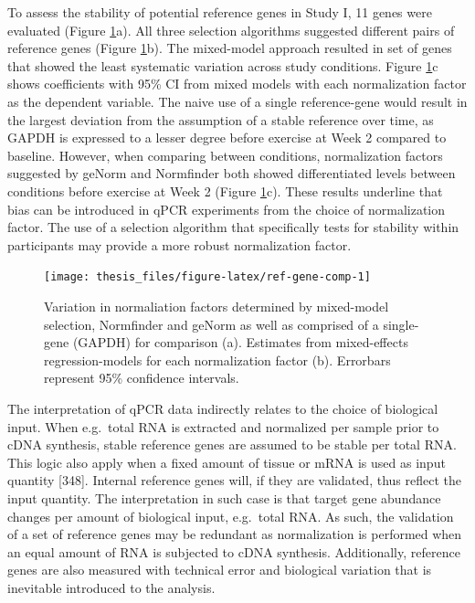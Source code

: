 \documentclass[twoside,10pt]{gihclass} %
\begin{document}
To assess the stability of potential reference genes in Study I, 11 genes were evaluated (Figure \ref{fig:ref-gene-comp}a). All three selection algorithms suggested different pairs of reference genes (Figure \ref{fig:ref-gene-comp}b). The mixed-model approach resulted in set of genes that showed the least systematic variation across study conditions. Figure \ref{fig:ref-gene-comp}c shows coefficients with 95\% CI from mixed models with each normalization factor as the dependent variable. The naive use of a single reference-gene would result in the largest deviation from the assumption of a stable reference over time, as GAPDH is expressed to a lesser degree before exercise at Week 2 compared to baseline. However, when comparing between conditions, normalization factors suggested by geNorm and Normfinder both showed differentiated levels between conditions before exercise at Week 2 (Figure \ref{fig:ref-gene-comp}c). These results underline that bias can be introduced in qPCR experiments from the choice of normalization factor. The use of a selection algorithm that specifically tests for stability within participants may provide a more robust normalization factor.
\begin{figure}

{\centering \texttt{[image: thesis\_files/figure-latex/ref-gene-comp-1]} 

}

\caption[Reference gene selection in Study I]{Variation in normaliation factors determined by mixed-model selection, Normfinder and geNorm as well as comprised of a single-gene (GAPDH) for comparison (a). Estimates from mixed-effects regression-models for each normalization factor (b). Errorbars represent 95\% confidence intervals.}\label{fig:ref-gene-comp}
\end{figure}
The interpretation of qPCR data indirectly relates to the choice of biological input. When e.g.~total RNA is extracted and normalized per sample prior to cDNA synthesis, stable reference genes are assumed to be stable per total RNA. This logic also apply when a fixed amount of tissue or mRNA is used as input quantity
{[}348{]}.
Internal reference genes will, if they are validated, thus reflect the input quantity. The interpretation in such case is that target gene abundance changes per amount of biological input, e.g.~total RNA.
As such, the validation of a set of reference genes may be redundant as normalization is performed when an equal amount of RNA is subjected to cDNA synthesis.
Additionally, reference genes are also measured with technical error and biological variation that is inevitable introduced to the analysis.
\end{document}
